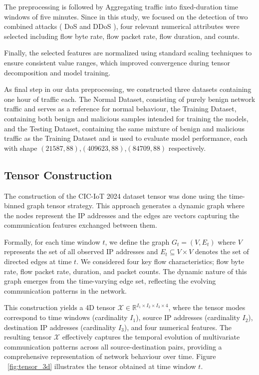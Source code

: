 \documentclass[pdflatex,sn-mathphys-num]{sn-jnl}
\theoremstyle{thmstyleone}
\theoremstyle{thmstyletwo}
\theoremstyle{thmstylethree}
\begin{document}
The preprocessing is followed by Aggregating traffic into fixed-duration time windows of five minutes. Since in this study, we focused on the detection of two combined attacks ( DoS and DDoS ), four relevant numerical attributes were selected including flow byte rate, flow packet rate, flow duration, and counts. 

Finally, the selected features are normalized using standard scaling techniques to ensure consistent value ranges, which improved convergence during tensor decomposition and model training.

As  final step in our data preprocessing, we constructed three datasets containing one hour of traffic each. The Normal Dataset, consisting of purely benign network traffic and serves as a reference for normal behaviour, the Training Dataset, containing both benign and malicious samples intended for training the models, and the Testing Dataset, containing the same mixture of benign and malicious traffic as the Training Dataset and is used to evaluate model performance, each with shape  $(21587, 88)$,$(409623, 88)$,$
(84709, 88)$ respectively. 





\subsection{Tensor Construction}
The construction of the CIC-IoT 2024 dataset tensor was done using the time-binned graph tensor strategy. This approach generates a dynamic graph where the nodes represent the IP addresses and the edges are vectors capturing the communication features exchanged between them. 

Formally, for each time window $t$, we define the graph $G_t = (V, E_t)$ where $V$ represents the set of all observed IP addresses and $E_t \subseteq V \times V$ denotes the set of directed edges at time $t$. We considered four key flow characteristics; flow byte rate, flow packet rate, duration, and packet counts. The dynamic nature of this graph emerges from the time-varying edge set, reflecting the evolving communication patterns in the network. 

This construction yields a 4D tensor $\mathcal{X} \in \mathbb{R}^{I_1 \times I_2 \times I_3 \times 4}$, where the tensor modes correspond to time windows (cardinality $I_1$), source IP addresses (cardinality $I_2$), destination IP addresses (cardinality $I_3$), and four numerical features. The resulting tensor $\mathcal{X}$ effectively captures the temporal evolution of multivariate communication patterns across all source-destination pairs, providing a comprehensive representation of network behaviour  over time. Figure ~\ref{fig:tensor_3d} illustrates the tensor obtained at time window $t$.
\end{document}
